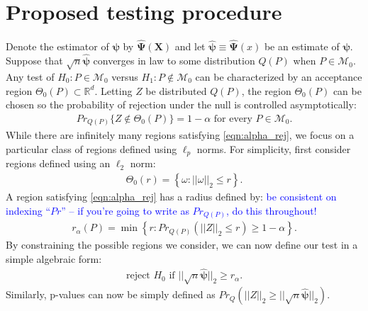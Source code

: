 \documentclass{article}
\newcommand{\rvo}{X}
\newcommand{\disto}{P}
\newcommand{\rvv}{Z}
\newcommand{\distv}{Q}
\begin{document}
\section{Proposed testing procedure}
\label{sec:prop_test_proc}
Denote the estimator of $\boldsymbol{\psi}$ by $\hat{\boldsymbol{\Psi}}(\boldsymbol{\rvo})$ and let $\hat{\boldsymbol{\psi}} \equiv \hat{\boldsymbol{\Psi}}(x)$ be an estimate of $\boldsymbol{\psi}$. Suppose that $\sqrt{n}\hat{\boldsymbol{\psi}}$ converges in law to some distribution $\distv(P)$ when $\disto \in \mathscr{M}_0$.  Any test of $H_0 : \disto \in \mathscr{M}_0$ versus $H_1 : \disto \not\in \mathscr{M}_0$ can be characterized by an acceptance region $\Theta_0(\disto) \subset \mathbb{R}^d$. Letting $\rvv$ be distributed $\distv(\disto)$, the region $\Theta_0(\disto)$ can be chosen so the probability of rejection under the null is controlled asymptotically:
\begin{align}
  Pr_{\distv(\disto)}\{\rvv \not \in \Theta_0(P)\} = 1 - \alpha \text{ for every } P \in \mathscr{M}_0.\label{eqn:alpha_rej}
\end{align}
While there are infinitely many regions satisfying \eqref{eqn:alpha_rej},  we focus on a particular class of regions defined using $\ell_p$ norms. For simplicity, first consider regions defined using an $\ell_2$ norm:
\begin{align*}
	\Theta_0(r) = \left\{\omega : ||\omega||_2 \leq r\right\}.
\end{align*}
A region satisfying \eqref{eqn:alpha_rej} has a radius defined by: \textcolor{blue}{be consistent on indexing ``$Pr$'' -- if you're going to write as $Pr_{Q(P)}$, do this throughout!}
\begin{align*}
	r_\alpha(\disto) = \min\left\{r : Pr_{\distv(\disto)}(||\rvv||_2 \leq r) \geq 1 - \alpha \right\}.
\end{align*}
By constraining the possible regions we consider, we can now define our test in a simple algebraic form:
\begin{align*}
	\text{reject } H_0 \text{ if } ||\sqrt{n} \hat{\boldsymbol{\psi}}||_2 \geq r_\alpha.
\end{align*}
Similarly, p-values can now be simply defined as $Pr_Q(||\rvv||_2 \geq ||\sqrt{n} \hat{\boldsymbol{\psi}}||_2)$.
\end{document}
